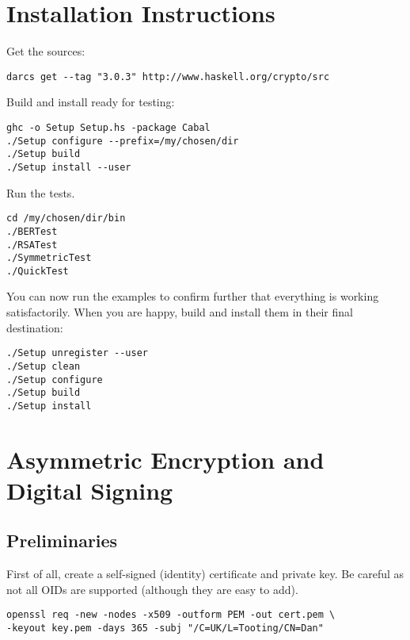 \documentclass{article}
\begin{document}
\section{Installation Instructions}

Get the sources:

\lstset{language=shell,basicstyle=\ttfamily\small}
\begin{lstlisting}[frame=single]
darcs get --tag "3.0.3" http://www.haskell.org/crypto/src
\end{lstlisting}

Build and install ready for testing:

\begin{lstlisting}[frame=single]
ghc -o Setup Setup.hs -package Cabal
./Setup configure --prefix=/my/chosen/dir
./Setup build
./Setup install --user
\end{lstlisting}

Run the tests.

\begin{lstlisting}[frame=single]
cd /my/chosen/dir/bin
./BERTest
./RSATest
./SymmetricTest
./QuickTest
\end{lstlisting}

You can now run the examples to confirm further that everything
is working satisfactorily.
When you are happy, build and install them in
their final destination:

\begin{lstlisting}[frame=single]
./Setup unregister --user
./Setup clean
./Setup configure
./Setup build
./Setup install
\end{lstlisting}

\section{Asymmetric Encryption and Digital Signing}

\subsection{Preliminaries}

First of all, create a self-signed (identity) certificate and private key.
Be careful as not all OIDs are supported (although they are easy to add).

\lstset{language=shell,basicstyle=\ttfamily\small}
\begin{lstlisting}[frame=single]
openssl req -new -nodes -x509 -outform PEM -out cert.pem \
-keyout key.pem -days 365 -subj "/C=UK/L=Tooting/CN=Dan"
\end{lstlisting}
\end{document}
